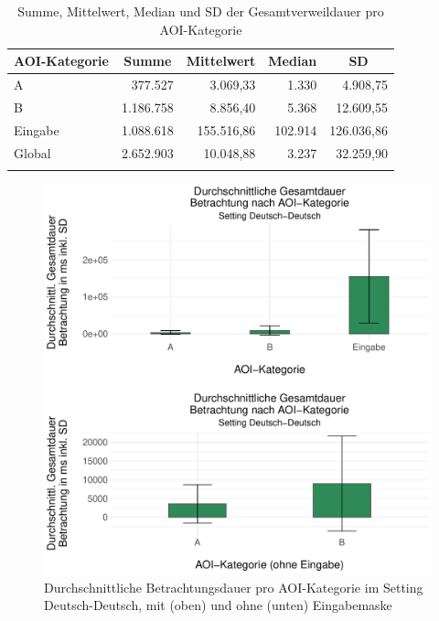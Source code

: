 
\begin{table}
    \begin{tabular}{lrrrr} 
    \lsptoprule
        {AOI-Kategorie} & \multicolumn{1}{c}{Summe} & \multicolumn{1}{c}{Mittelwert} & \multicolumn{1}{c}{Median} & \multicolumn{1}{c}{SD} \\ 
        \midrule
        A & 377.527 & 3.069,33 & 1.330 & 4.908,75 \\ 
        B & 1.186.758  & 8.856,40 & 5.368 & 12.609,55 \\ 
        Eingabe & 1.088.618  & 155.516,86 & 102.914 & 126.036,86 \\ 
        \midrule
        Global & 2.652.903 & 10.048,88 & 3.237 & 32.259,90 \\ 
        \lspbottomrule
    \end{tabular}
    \caption[Summe, Mittelwert, Median und SD der Gesamtverweildauer]
            {Summe, Mittelwert, Median und SD der Gesamtverweildauer 
             pro AOI-Kategorie\label{K6:tab:DeDe:mean-sd-dwell}}
    
\end{table}

\begin{figure}
    \includegraphics[width=.85\textwidth]{Figures/EyeTracking/DD/ggplot_DD_mean-dwell_AOI-grid-arrange_de}
	\caption{Durchschnittliche Betrachtungsdauer pro AOI-Kategorie im Setting Deutsch-Deutsch, mit (oben) und ohne (unten) Eingabemaske}
	\label{K6:fig:DD:mean-Dwell}
\end{figure}

